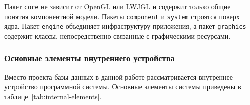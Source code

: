 Пакет \texttt{core} не зависит от OpenGL или LWJGL и содержит только общие
понятия компонентной модели. Пакеты \texttt{component} и \texttt{system}
строятся поверх ядра. Пакет \texttt{engine} объединяет инфраструктуру
приложения, а пакет \texttt{graphics} содержит классы, непосредственно связанные
с графическими ресурсами.

\subsubsection{Основные элементы внутреннего устройства}

Вместо проекта базы данных в данной работе рассматривается внутреннее устройство
программной системы. Основные элементы системы приведены в
таблице~\ref{tab:internal-elements}.

\begingroup
\small
\setlength{\tabcolsep}{4pt}
\renewcommand{\arraystretch}{1.2}

